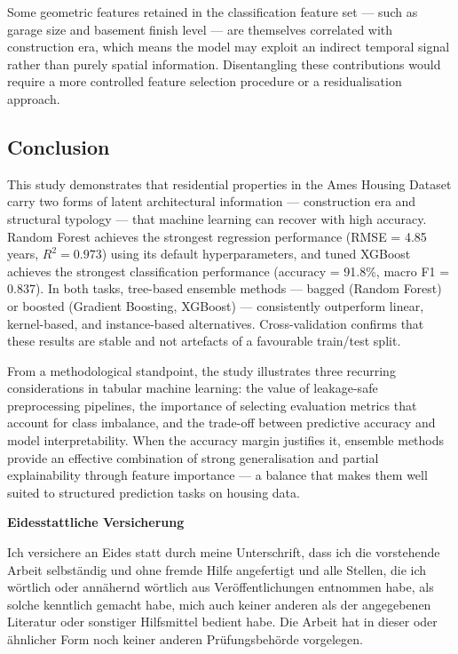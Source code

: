 \documentclass[11pt,a4paper]{article}
\begin{document}
Some geometric features retained in the classification feature set ---
such as garage size and basement finish level --- are themselves
correlated with construction era, which means the model may exploit an
indirect temporal signal rather than purely spatial information.
Disentangling these contributions would require a more controlled
feature selection procedure or a residualisation approach.

\subsection{Conclusion}\label{conclusion}

This study demonstrates that residential properties in the Ames Housing
Dataset carry two forms of latent architectural information ---
construction era and structural typology --- that machine learning can
recover with high accuracy. Random Forest achieves the strongest
regression performance (RMSE = 4.85 years, \(R^2 = 0.973\)) using its
default hyperparameters, and tuned XGBoost achieves the strongest
classification performance (accuracy = 91.8\%, macro F1 = 0.837). In
both tasks, tree-based ensemble methods --- bagged (Random Forest) or
boosted (Gradient Boosting, XGBoost) --- consistently outperform linear,
kernel-based, and instance-based alternatives. Cross-validation confirms
that these results are stable and not artefacts of a favourable
train/test split.

From a methodological standpoint, the study illustrates three recurring
considerations in tabular machine learning: the value of leakage-safe
preprocessing pipelines, the importance of selecting evaluation metrics
that account for class imbalance, and the trade-off between predictive
accuracy and model interpretability. When the accuracy margin justifies
it, ensemble methods provide an effective combination of strong
generalisation and partial explainability through feature importance ---
a balance that makes them well suited to structured prediction tasks on
housing data.
\renewcommand*{\mkbibnamefamily}[1]{\textbf{#1}}
\renewcommand*{\mkbibnamegiven}[1]{\textbf{#1}}
\renewcommand*{\mkbibnameprefix}[1]{\textbf{#1}}
\renewcommand*{\mkbibnamesuffix}[1]{\textbf{#1}}
\printbibliography[title=References]

\newpage
\textbf{Eidesstattliche Versicherung}

\bigskip

Ich versichere an Eides statt durch meine Unterschrift, dass ich die vorstehende Arbeit selbständig und ohne fremde Hilfe angefertigt und alle Stellen, die ich wörtlich oder annähernd wörtlich aus Veröffentlichungen entnommen habe, als solche kenntlich gemacht habe, mich auch keiner anderen als der angegebenen Literatur oder sonstiger Hilfsmittel bedient habe. Die Arbeit hat in dieser oder ähnlicher Form noch keiner anderen Prüfungsbehörde vorgelegen.

\vspace{1cm}
\rule{0pt}{2\baselineskip} %
\par\noindent{} \hfill\makebox[2.25in]{\hrulefill}%
\par\noindent\makebox[2.25in][l]{} \hfill{}%
\end{document}
